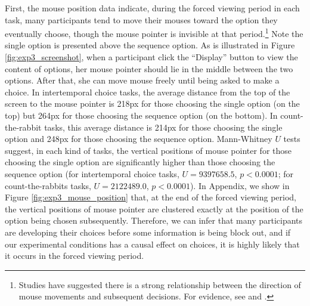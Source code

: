 \documentclass[
  12pt,
]{article}
\begin{document}
First, the mouse position data indicate, during the forced viewing
period in each task, many participants tend to move their mouses toward
the option they eventually choose, though the mouse pointer is invisible
at that period.\footnote{Studies have suggested there is a strong
  relationship between the direction of mouse movements and subsequent
  decisions. For evidence, see \citet{freeman2010mousetracker} and
  \citet{freeman2018doing}.} Note the single option is presented above
the sequence option. As is illustrated in Figure
\ref{fig:exp3_screenshot}, when a participant click the ``Display''
button to view the content of options, her mouse pointer should lie in
the middle between the two options. After that, she can move mouse
freely until being asked to make a choice. In intertemporal choice
tasks, the average distance from the top of the screen to the mouse
pointer is 218px for those choosing the single option (on the top) but
264px for those choosing the sequence option (on the bottom). In
count-the-rabbit tasks, this average distance is 214px for those
choosing the single option and 248px for those choosing the sequence
option. Mann-Whitney \(U\) tests suggest, in each kind of tasks, the
vertical positions of mouse pointer for those choosing the single option
are significantly higher than those choosing the sequence option (for
intertemporal choice tasks, \(U = 9397658.5\), \(p<0.0001\); for
count-the-rabbits tasks, \(U=2122489.0\), \(p<0.0001\)). In Appendix, we
show in Figure \ref{fig:exp3_mouse_position} that, at the end of the
forced viewing period, the vertical positions of mouse pointer are
clustered exactly at the position of the option being chosen
subsequently. Therefore, we can infer that many participants are
developing their choices before some information is being block out, and
if our experimental conditions has a causal effect on choices, it is
highly likely that it occurs in the forced viewing period.
\end{document}
